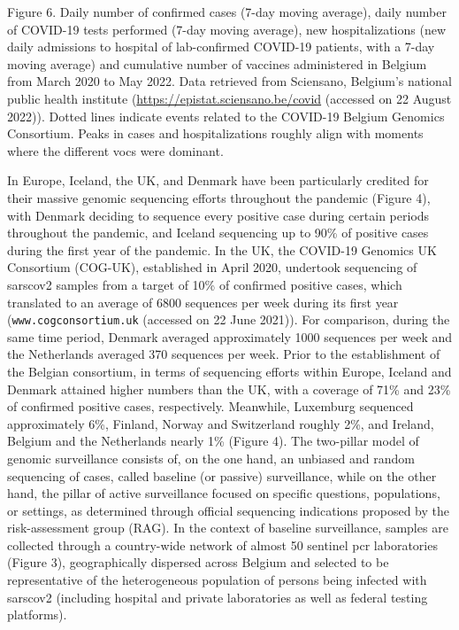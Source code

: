 Figure 6. Daily number of confirmed cases (7-day moving average), daily number of COVID-19 tests performed (7-day moving average), new hospitalizations (new daily admissions to hospital of lab-confirmed COVID-19 patients, with a 7-day moving average) and cumulative number of vaccines administered in Belgium from March 2020 to May 2022.
Data retrieved from Sciensano, Belgium's national public health institute (\url{https://epistat.sciensano.be/covid} (accessed on 22 August 2022)).
Dotted lines indicate events related to the COVID-19 Belgium Genomics Consortium.
Peaks in cases and hospitalizations roughly align with moments where the different \gls{voc}s were dominant.


In Europe, Iceland, the UK, and Denmark have been particularly credited for their massive genomic sequencing efforts throughout the pandemic (Figure 4), with Denmark deciding to sequence every positive case during certain periods throughout the pandemic, and Iceland sequencing up to 90\% of positive cases during the first year of the pandemic.
In the UK, the COVID-19 Genomics UK Consortium (COG-UK), established in April 2020, undertook sequencing of \gls{sarscov2} samples from a target of 10\% of confirmed positive cases, which translated to an average of 6800 sequences per week during its first year (\verb|www.cogconsortium.uk| (accessed on 22 June 2021)).
For comparison, during the same time period, Denmark averaged approximately 1000 sequences per week and the Netherlands averaged 370 sequences per week.
Prior to the establishment of the Belgian consortium, in terms of sequencing efforts within Europe, Iceland and Denmark attained higher numbers than the UK, with a coverage of 71\% and 23\% of confirmed positive cases, respectively.
Meanwhile, Luxemburg sequenced approximately 6\%, Finland, Norway and Switzerland roughly 2\%, and Ireland, Belgium and the Netherlands nearly 1\% (Figure 4).
The two-pillar model of genomic surveillance consists of, on the one hand, an unbiased and random sequencing of cases, called baseline (or passive) surveillance, while on the other hand, the pillar of active surveillance focused on specific questions, populations, or settings, as determined through official sequencing indications proposed by the risk-assessment group (RAG).
In the context of baseline surveillance, samples are collected through a country-wide network of almost 50 sentinel \gls{pcr} laboratories (Figure 3), geographically dispersed across Belgium and selected to be representative of the heterogeneous population of persons being infected with \gls{sarscov2} (including hospital and private laboratories as well as federal testing platforms).
